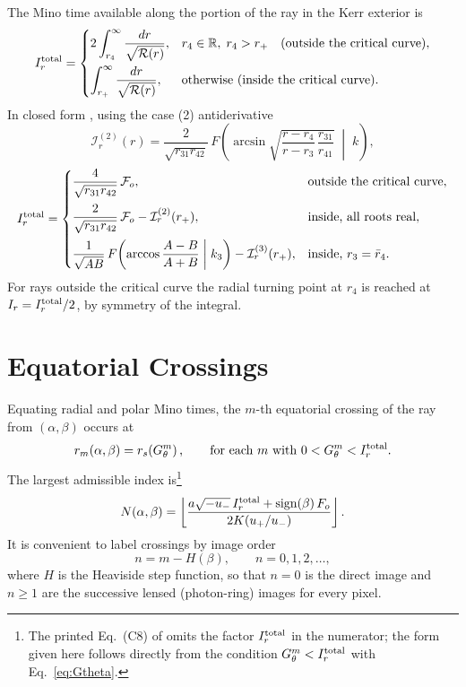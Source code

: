 \documentclass[11pt]{article}
\begin{document}
The Mino time available along the portion of the ray in the Kerr exterior is
\begin{equation}
I_r^{\rm total} =
\begin{cases}
2\displaystyle\int_{r_4}^{\infty}\frac{dr}{\sqrt{\mathcal{R}(r)}}, & r_4 \in \mathbb{R},\; r_4 > r_+ \quad \text{(outside the critical curve)}, \\[2.5ex]
\displaystyle\int_{r_+}^{\infty}\frac{dr}{\sqrt{\mathcal{R}(r)}}, & \text{otherwise (inside the critical curve)}.
\end{cases}
\end{equation}
In closed form \cite{GL2020lensing}, using the case (2) antiderivative
\begin{equation}
\mathcal{I}_r^{(2)}(r) = \frac{2}{\sqrt{r_{31}r_{42}}}\,
F\!\left(\arcsin\sqrt{\frac{r - r_4}{r - r_3}\,\frac{r_{31}}{r_{41}}}\;\middle|\;k\right),
\end{equation}
\begin{equation}
I_r^{\rm total} =
\begin{cases}
\dfrac{4}{\sqrt{r_{31}r_{42}}}\,\mathcal{F}_o, & \text{outside the critical curve}, \\[2.5ex]
\dfrac{2}{\sqrt{r_{31}r_{42}}}\,\mathcal{F}_o - \mathcal{I}_r^{(2)}(r_+), & \text{inside, all roots real}, \\[2.5ex]
\dfrac{1}{\sqrt{AB}}\,F\!\left(\arccos\dfrac{A - B}{A + B}\;\middle|\;k_3\right) - \mathcal{I}_r^{(3)}(r_+), & \text{inside, } r_3 = \bar r_4.
\end{cases}
\end{equation}
For rays outside the critical curve the radial turning point at $r_4$ is
reached at $I_r = I_r^{\rm total}/2$, by symmetry of the integral.

\section{Equatorial Crossings}

Equating radial and polar Mino times, the $m$-th equatorial crossing of the
ray from $(\alpha,\beta)$ occurs at
\begin{equation}
r_m(\alpha,\beta) = r_s\!\left(G_\theta^{m}\right),
\qquad \text{for each } m \text{ with } 0 < G_\theta^{m} < I_r^{\rm total}.
\end{equation}
The largest admissible index is\footnote{The printed Eq.~(C8) of
\cite{GLM2020} omits the factor $I_r^{\rm total}$ in the numerator; the form
given here follows directly from the condition $G_\theta^m < I_r^{\rm total}$
with Eq.~\eqref{eq:Gtheta}.}
\begin{equation}
N(\alpha,\beta) = \left\lfloor
\frac{a\sqrt{-u_-}\,I_r^{\rm total} + \operatorname{sign}(\beta)\,F_o}{2K(u_+/u_-)}
\right\rfloor .
\end{equation}
It is convenient to label crossings by image order
\begin{equation}
n = m - H(\beta), \qquad n = 0,1,2,\dots,
\end{equation}
where $H$ is the Heaviside step function, so that $n = 0$ is the direct image
and $n \ge 1$ are the successive lensed (photon-ring) images for every pixel.
\end{document}
